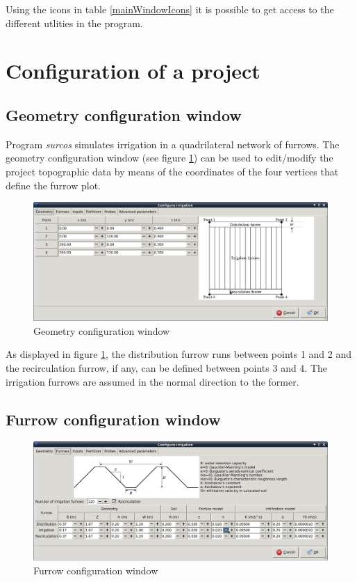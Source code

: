 Using the icons in table \ref{mainWindowIcons} it is possible to get access to the different utlities in the program.\\
\section{Configuration of a project}
\subsection{Geometry configuration window}

Program \emph{surcos} simulates irrigation in a quadrilateral network of furrows. The geometry configuration window (see figure \ref{geomWindow}) can be used to edit/modify the project topographic data by means of the coordinates of the four vertices that define the furrow plot.

\begin{figure}[!h]
\begin{center}
\includegraphics*[width=\textwidth]{images/confGeomEN.png}
\qquad
\caption{Geometry configuration window}\label{geomWindow}
\end{center}
\end{figure}

As displayed in figure \ref{geomWindow}, the distribution furrow runs between points 1 and 2 and the recirculation furrow, if any, can be defined between points 3 and 4. The irrigation furrows are assumed in the normal direction to the former.

\subsection{Furrow configuration window}

\begin{figure}[!h]
\begin{center}
\includegraphics*[width=\textwidth]{images/confSurcoEN.png}
\qquad
\caption{Furrow configuration window}\label{confSurcos}
\end{center}
\end{figure}

